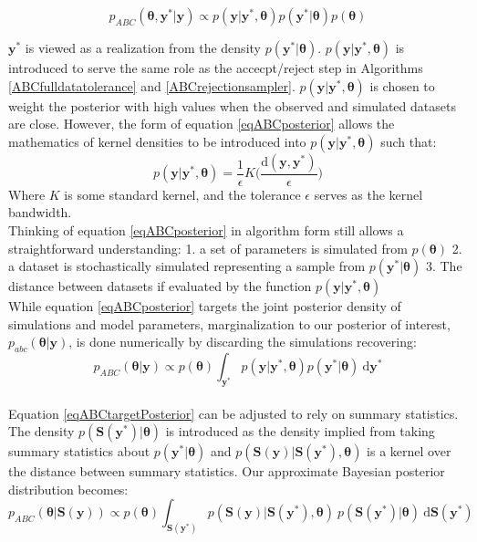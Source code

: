 \begin{equation}
p_{ABC}(\bm{\theta},\bm{y^*}|\bm{y}) \propto p(\bm{y}|\bm{y^*},\bm{\theta}) p(\bm{y^*}|\bm{\theta}) p(\bm{\theta})
\label{eqABCposterior}
\end{equation}

$\bm{y^*}$ is viewed as a realization from the density $p(\bm{y^*}|\bm{\theta})$. $p(\bm{y}|\bm{y^*},\bm{\theta})$ is introduced to serve the same role as the accecpt/reject step in Algorithms \ref{ABCfulldatatolerance} and \ref{ABCrejectionsampler}. $p(\bm{y}|\bm{y^*},\bm{\theta})$ is chosen to weight the posterior with high values when the observed and simulated datasets are close. However, the form of equation \ref{eqABCposterior} allows the mathematics of kernel densities to be introduced into $p(\bm{y}|\bm{y^*},\bm{\theta})$ such that:
\begin{equation}
p(\bm{y}|\bm{y^*},\bm{\theta}) = \frac{1}{\epsilon} K \Big(\frac{\text{d}(\bm{y},\bm{y^*})}{\epsilon}\Big)
\label{generic-weighting-kernel}
\end{equation}
Where $K$ is some standard kernel, and the tolerance $\epsilon$ serves as the kernel bandwidth. \\

Thinking of equation \ref{eqABCposterior} in algorithm form still allows a straightforward understanding: 1. a set of parameters is simulated from $p(\bm{\theta})$ 2. a dataset is stochastically simulated representing a sample from $p(\bm{y^*}|\bm{\theta})$ 3. The distance between datasets if evaluated by the function $p(\bm{y}|\bm{y^*},\bm{\theta})$\\

While equation \ref{eqABCposterior} targets the joint posterior density of simulations and model parameters, marginalization to our posterior of interest, $p_{abc}(\bm{\theta}|\bm{y})$, is done numerically by discarding the simulations recovering:
\begin{equation}
p_{ABC}(\bm{\theta}|\bm{y}) \propto p(\bm{\theta}) \int_{\bm{y^*}} p(\bm{y}|\bm{y^*},\bm{\theta}) p(\bm{y^*}|\bm{\theta})\ \text{d}\bm{y^*}
\label{eqABCtargetPosterior}
\end{equation}\\

Equation \ref{eqABCtargetPosterior} can be adjusted to rely on summary statistics. The density $p(\bm{S}(\bm{y^*})|\bm{\theta})$ is introduced as the density implied from taking summary statistics about $p(\bm{y^*}|\bm{\theta})$ and $p(\bm{S}(\bm{y})|\bm{S}(\bm{y^*}),\bm{\theta})$ is a kernel over the distance between summary statistics. Our approximate Bayesian posterior distribution becomes:
\begin{equation}
p_{ABC}(\bm{\theta}|\bm{S}(\bm{y})) \propto p(\bm{\theta}) \int_{\bm{S}(\bm{y^*})} p(\bm{S}(\bm{y})|\bm{S}(\bm{y^*}),\bm{\theta})\  p(\bm{S}(\bm{y^*})|\bm{\theta})\ \text{d}\bm{S}(\bm{y^*})
\label{summary-stat-abc-posterior}
\end{equation}

